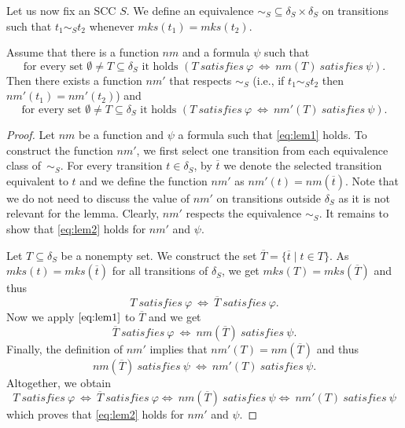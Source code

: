 \documentclass[a4paper,UKenglish,cleveref,autoref,thm-restate]{lipics-v2021}
\newcommand{\mks}{\mathit{mks}}
\newcommand{\rem}{\mathit{nm}}
\newcommand{\msat}{\mathit{satisfies}}
\begin{document}
Let us now fix an SCC $S$. We define an equivalence
${\sim_S}\subseteq\delta_S\times\delta_S$ on transitions %
such that $t_1\sim_S t_2$ whenever $\mks(t_1)=\mks(t_2)$.
\begin{lemma} Assume that there is a function $\rem$ and a formula
  $\psi$ such that
  \[
    \textrm{for every set $\emptyset\neq T\subseteq\delta_S$ it holds }
      (T~\msat~\varphi~\iff~\rem(T)~\msat~\psi).\tag{$1$}\label{eq:lem1} 
  \]  
  Then there exists a function $\rem'$ that respects %
  $\sim_S$ (i.e.,
  if $t_1\sim_S t_2$ then $\rem'(t_1)=\rem'(t_2)$) and
  \[
    \textrm{for every set $\emptyset\neq T\subseteq\delta_S$ it holds }
    (T~\msat~\varphi~\iff~\rem'(T)~\msat~\psi).\tag{$2$}\label{eq:lem2} 
  \]  
\end{lemma}
\begin{proof}
  Let $\rem$ be a function and $\psi$ a formula such that
  \eqref{eq:lem1} holds. To construct the function $\rem'$, we first
  select one transition from each equivalence class of~$\sim_S$. For
  every transition $t\in\delta_S$, by $\overline{t}$ we denote the
  selected transition equivalent to $t$ and we define the function
  $\rem'$ as $\rem'(t)=\rem(\overline{t})$. Note that we do not need
  to discuss the value of $\rem'$ on transitions outside $\delta_S$ as
  it is not relevant for the lemma. Clearly, $\rem'$ respects the
  equivalence $\sim_S$. It remains to show that \eqref{eq:lem2} holds
  for $\rem'$ and $\psi$.

  Let $T\subseteq\delta_S$ be a %
  nonempty set. We construct
  the set $\overline{T}=\{\overline{t}\mid t\in T\}$. As
  $\mks(t)=\mks(\overline{t})$ for all transitions of $\delta_S$, we
  get $\mks(T)=\mks(\overline{T})$ and thus
  \[
    T~\msat~\varphi~\iff~\overline{T}~\msat~\varphi.
  \]
  Now we apply $\eqref{eq:lem1}$ to $\overline{T}$ and we get %
  \[
    \overline{T}~\msat~\varphi~\iff~\rem(\overline{T})~\msat~\psi.
  \]
  Finally, the definition of $\rem'$ implies that
  $\rem'(T)=\rem(\overline{T})$ and thus
  \[
    \rem(\overline{T})~\msat~\psi~\iff~\rem'(T)~\msat~\psi.
  \]
  Altogether, we obtain
  \[
      T~\msat~\varphi~ 
      \iff~\overline{T}~\msat~\varphi
      \iff~\rem(\overline{T})~\msat~\psi
      \iff~\rem'(T)~\msat~\psi
  \]  
  which proves that \eqref{eq:lem2} holds for $\rem'$ and $\psi$.%
\end{proof}
\end{document}
